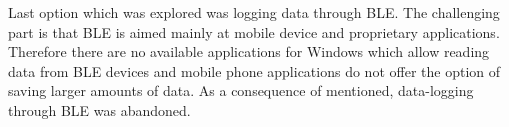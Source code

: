 Last option which was explored was logging data through BLE. The challenging part is that BLE is aimed mainly at mobile device and proprietary applications. Therefore there are no available applications for Windows which allow reading data from BLE devices and mobile phone applications do not offer the option of saving larger amounts of data. As a consequence of mentioned, data-logging through BLE was abandoned.